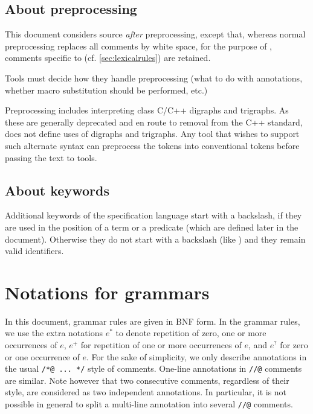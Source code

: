 

\subsection{About preprocessing}

This document considers \lang{} source \emph{after} preprocessing, except that, whereas normal preprocessing replaces all comments by white space, 
for the purpose of 
\NAME{}, comments specific to \NAME{} (cf. \ref{sec:lexicalrules}) are retained.

Tools must decide how they handle preprocessing (what to do with
annotations, whether macro substitution should be performed, etc.)

Preprocessing includes interpreting class C/C++ digraphs and trigraphs.
As these are generally deprecated and en route to removal from the C++
standard, \NAME{} does not define uses of digraphs and trigraphs. Any tool that wishes to support such alternate syntax can preprocess the tokens into conventional tokens before passing the text to \NAME{} tools.


\subsection{About keywords}

Additional keywords of the specification language start with a
backslash, if they are used in the position of a term or a predicate
(which are defined later in the document).  Otherwise they do not start
with a backslash (like \ensures{}) and they remain valid identifiers.

\section{Notations for grammars}

In this document, grammar rules are given in BNF form. In the grammar
rules, we use the extra notations $e^*$ to denote repetition of zero, one
or more occurrences of $e$, $e^+$ for repetition of one or more
occurrences of $e$, and $e^?$ for zero or one occurrence of $e$.  For
the sake of simplicity, we only describe annotations in the usual
\lstinline|/*@ ... */| style of comments. One-line annotations
in \lstinline|//@| comments are similar. Note however that two consecutive
comments, regardless of their style, are considered as two independent
annotations. In particular, it is not possible in general to split a multi-line
annotation into several \lstinline|//@| comments.

